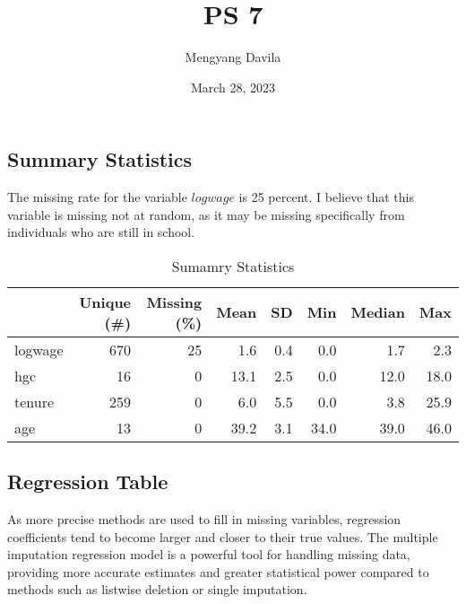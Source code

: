\documentclass{article}
\title{PS 7}
\author{Mengyang Davila}
\date{March 28, 2023}
\begin{document}
\maketitle
\subsection*{Summary Statistics}
The missing rate for the variable $logwage$ is 25 percent. I believe that this variable is missing not at random, as it may be missing specifically from individuals who are still in school.
\begin{table}[htbp]
\centering
\caption{Sumamry Statistics}
\begin{tabular}[t]{lrrrrrrr}
\toprule
  & Unique (\#) & Missing (\%) & Mean & SD & Min & Median & Max\\
\midrule
logwage & 670 & 25 & \num{1.6} & \num{0.4} & \num{0.0} & \num{1.7} & \num{2.3}\\
hgc & 16 & 0 & \num{13.1} & \num{2.5} & \num{0.0} & \num{12.0} & \num{18.0}\\
tenure & 259 & 0 & \num{6.0} & \num{5.5} & \num{0.0} & \num{3.8} & \num{25.9}\\
age & 13 & 0 & \num{39.2} & \num{3.1} & \num{34.0} & \num{39.0} & \num{46.0}\\
\bottomrule
\end{tabular}
\end{table}


\subsection*{Regression Table}
As more precise methods are used to fill in missing variables, regression coefficients tend to become larger and closer to their true values. The multiple imputation regression model is a powerful tool for handling missing data, providing more accurate estimates and greater statistical power compared to methods such as listwise deletion or single imputation.
\end{document}
